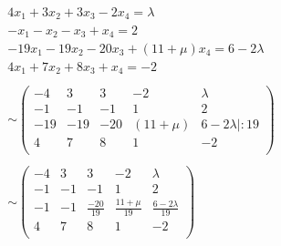 \documentclass{article}
\begin{document}
    \begin{align*}
        4x_1 + 3x_2 + 3x_3 - 2x_4 = \lambda\\
        -x_1 - x_2 - x_3 + x_4 = 2\\
        -19x_1 - 19x_2 - 20x_3 + (11 + \mu)x_4 = 6 - 2\lambda\\
        4x_1 + 7x_2 + 8x_3 + x_4 = -2\\
        \\
        \sim
        \begin{pmatrix}
            -4  &   3 &   3 & -2         &  \lambda\\
            -1  &  -1 &  -1 &  1         &  2\\
            -19 & -19 & -20 & (11 + \mu) &  6 - 2\lambda | : 19\\
            4   &   7 & 8   & 1          & -2\\
        \end{pmatrix}\\
        \\
        \sim
        \begin{pmatrix}
            -4 &  3 &  3 & -2        &  \lambda\\
            -1 & -1 & -1 &  1        &  2\\
            -1 & -1 & \frac{-20}{19}  & \frac{11 + \mu}{19} &  \frac{6 - 2\lambda}{19}\\
            4  &  7 &  8   & 1         & -2\\
        \end{pmatrix}\\
    \end{align*}
\end{document}
